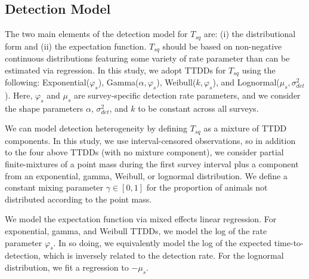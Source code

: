 \documentclass[useAMS,usenatbib,referee,12pt]{article}
\begin{document}
\subsection{Detection Model}\label{sec:detectionmodel}

The two main elements of the detection model for $T_{sq}$ are: (i) the distributional form and (ii) the expectation function.
$T_{sq}$ should be based on non-negative continuous distributions featuring some variety of rate parameter than can be estimated via regression.  
In this study, we adopt TTDDs for $T_{sq}$ using the following: Exponential($\varphi_{s}$), Gamma($\alpha, \varphi_{s}$), Weibull($k, \varphi_{s}$), and Lognormal($\mu_{s}, \sigma_{det}^2$).  
Here, $\varphi_{s}$ and $\mu_{s}$ are survey-specific detection rate parameters, and we consider the shape parameters $\alpha$, $\sigma_{det}^2$, and $k$ to be constant across all surveys.

We can model detection heterogeneity by defining $T_{sq}$ as a mixture of TTDD components.  
In this study, we use interval-censored observations, so in addition to the four above TTDDs (with no mixture component), we consider partial finite-mixtures of a point mass during the first survey interval plus a component from an exponential, gamma, Weibull, or lognormal distribution.  
We define a constant mixing parameter $\gamma \in [0,1]$ for the proportion of animals not distributed according to the point mass.

We model the expectation function via mixed effects linear regression.  
For exponential, gamma, and Weibull TTDDs, we model the log of the rate parameter $\varphi_{s}$.  
In so doing, we equivalently model the log of the expected time-to-detection, which is inversely related to the detection rate.  
For the lognormal distribution, we fit a regression to $-\mu_{s}$.  
\end{document}
